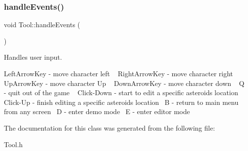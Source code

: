 \subsubsection{\texorpdfstring{handleEvents()}{handleEvents()}}
{\footnotesize\ttfamily void Tool\+::handle\+Events (\begin{DoxyParamCaption}{ }\end{DoxyParamCaption})}



Handles user input. 

Left\+Arrow\+Key -\/ move character left ~\newline
Right\+Arrow\+Key -\/ move character right ~\newline
Up\+Arrow\+Key -\/ move character Up ~\newline
Down\+Arrow\+Key -\/ move character down ~\newline
Q -\/ quit out of the game ~\newline
Click-\/\+Down -\/ start to edit a specific asteroid\textquotesingle{}s location~\newline
Click-\/\+Up -\/ finish editing a specific asteroid\textquotesingle{}s location~\newline
B -\/ return to main menu from any screen~\newline
D -\/ enter demo mode~\newline
E -\/ enter editor mode~\newline


The documentation for this class was generated from the following file\+:\begin{DoxyCompactItemize}
\item 
Tool.\+h\end{DoxyCompactItemize}
